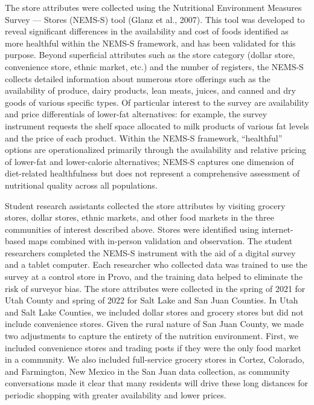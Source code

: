 \documentclass[
  letterpaper,
  number,
  review,
  3p]{elsarticle}
\begin{document}
The store attributes were collected using the Nutritional Environment
Measures Survey --- Stores (NEMS-S) tool (Glanz et al., 2007). This tool
was developed to reveal significant differences in the availability and
cost of foods identified as more healthful within the NEMS-S framework,
and has been validated for this purpose. Beyond superficial attributes
such as the store category (dollar store, convenience store, ethnic
market, etc.) and the number of registers, the NEMS-S collects detailed
information about numerous store offerings such as the availability of
produce, dairy products, lean meats, juices, and canned and dry goods of
various specific types. Of particular interest to the survey are
availability and price differentials of lower-fat alternatives: for
example, the survey instrument requests the shelf space allocated to
milk products of various fat levels and the price of each product.
Within the NEMS-S framework, ``healthful'' options are operationalized
primarily through the availability and relative pricing of lower-fat and
lower-calorie alternatives; NEMS-S captures one dimension of
diet-related healthfulness but does not represent a comprehensive
assessment of nutritional quality across all populations.

Student research assistants collected the store attributes by visiting
grocery stores, dollar stores, ethnic markets, and other food markets in
the three communities of interest described above. Stores were
identified using internet-based maps combined with in-person validation
and observation. The student researchers completed the NEMS-S instrument
with the aid of a digital survey and a tablet computer. Each researcher
who collected data was trained to use the survey at a control store in
Provo, and the training data helped to eliminate the risk of surveyor
bias. The store attributes were collected in the spring of 2021 for Utah
County and spring of 2022 for Salt Lake and San Juan Counties. In Utah
and Salt Lake Counties, we included dollar stores and grocery stores but
did not include convenience stores. Given the rural nature of San Juan
County, we made two adjustments to capture the entirety of the nutrition
environment. First, we included convenience stores and trading posts if
they were the only food market in a community. We also included
full-service grocery stores in Cortez, Colorado, and Farmington, New
Mexico in the San Juan data collection, as community conversations made
it clear that many residents will drive these long distances for
periodic shopping with greater availability and lower prices.
\end{document}
